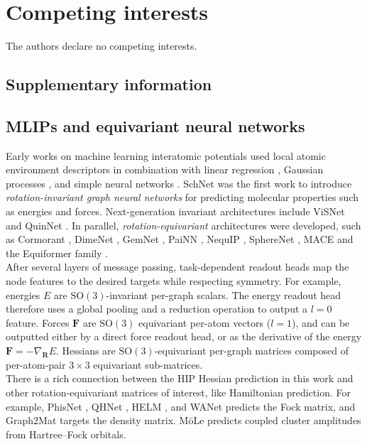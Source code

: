 \documentclass[pdflatex,sn-mathphys-num]{sn-jnl}%
\theoremstyle{thmstyleone}%
\theoremstyle{thmstyletwo}%
\theoremstyle{thmstylethree}%
\begin{document}
\section{Competing interests}
The authors declare no competing interests.


\begin{appendices}


\section{Supplementary information}
\subsection{MLIPs and equivariant neural networks}
Early works on machine learning interatomic potentials used local atomic environment descriptors in combination with linear regression \citep{thompson2015,shapeev2016}, Gaussian processes \citep{bartok2010}, and simple neural networks \citep{behler2007}.
SchNet \citep{schutt2018} was the first work to introduce \textit{rotation-invariant graph neural networks} for predicting molecular properties such as energies and forces. Next-generation invariant architectures include ViSNet \citep{wang2022} and QuinNet \citep{wang2024}.
In parallel, \textit{rotation-equivariant} architectures were developed, such as Cormorant \citep{anderson2019}, DimeNet \citep{gasteiger2020}, GemNet \citep{gasteiger2021}, PaiNN \citep{schutt2021}, NequIP \citep{batzner2022}, SphereNet \citep{liu2022}, MACE \citep{batatia2022} and the Equiformer family \citep{liao2023, liao2023equiformerv2, burger2025dequify}. \\
After several layers of message passing, task-dependent readout heads map the node features to the desired targets while respecting symmetry. For example, energies $E$ are $\mathrm{SO}(3)$-invariant per-graph scalars. The energy readout head therefore uses a global pooling and a reduction operation to output a $l{=}0$ feature. Forces $\mathbf{F}$ are $\mathrm{SO}(3)$ equivariant per-atom vectors ($l=1$), and can be outputted either by a direct force readout head, or as the derivative of the energy $\mathbf{F} = -\nabla_\mathbf{R} E$. Hessians are $\mathrm{SO}(3)$-equivariant per-graph matrices composed of per-atom-pair $3\times3$ equivariant sub-matrices. \\
There is a rich connection between the HIP Hessian prediction in this work and other rotation-equivariant matrices of interest, like Hamiltonian prediction. For example, PhisNet \cite{unke2021se}, QHNet \cite{yu2023efficient}, HELM \cite{Kaniselvan2025helm}, and WANet \cite{li2025enhancing} predicts the Fock matrix, and Graph2Mat \cite{febrer2025graph2mat} targets the density matrix. MōLe \citep{thiede2026mole,burger2026molelambda} predicts coupled cluster amplitudes from Hartree–Fock orbitals.
% 

\end{appendices}
\end{document}
